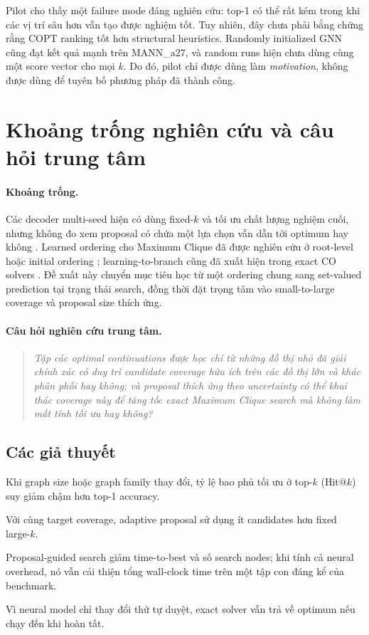 \documentclass[11pt,a4paper]{article}
\makeatletter
\newcommand{\hitk}{\mathrm{Hit@}k}
\makeatother
\begin{document}
Pilot cho thấy một failure mode đáng nghiên cứu: top-1 có thể rất kém trong khi các vị trí sâu hơn vẫn tạo được nghiệm tốt. Tuy nhiên, đây chưa phải bằng chứng rằng COPT ranking tốt hơn structural heuristics. Randomly initialized GNN cũng đạt kết quả mạnh trên MANN\_a27, và random runs hiện chưa dùng cùng một score vector cho mọi $k$. Do đó, pilot chỉ được dùng làm \emph{motivation}, không được dùng để tuyên bố phương pháp đã thành công.

\section{Khoảng trống nghiên cứu và câu hỏi trung tâm}

\paragraph{Khoảng trống.}
Các decoder multi-seed hiện có dùng fixed-$k$ và tối ưu chất lượng nghiệm cuối, nhưng không đo xem proposal có chứa một lựa chọn vẫn dẫn tới optimum hay không \citep{min2022hybrid}. Learned ordering cho Maximum Clique đã được nghiên cứu ở root-level hoặc initial ordering \citep{min2025ordering}; learning-to-branch cũng đã xuất hiện trong exact CO solvers \citep{kuang2024gs4co,zhang2022branching}. Đề xuất này chuyển mục tiêu học từ một ordering chung sang set-valued prediction tại trạng thái search, đồng thời đặt trọng tâm vào small-to-large coverage và proposal size thích ứng.

\paragraph{Câu hỏi nghiên cứu trung tâm.}
\begin{quote}
\emph{Tập các optimal continuations được học chỉ từ những đồ thị nhỏ đã giải chính xác có duy trì candidate coverage hữu ích trên các đồ thị lớn và khác phân phối hay không; và proposal thích ứng theo uncertainty có thể khai thác coverage này để tăng tốc exact Maximum Clique search mà không làm mất tính tối ưu hay không?}
\end{quote}

\subsection{Các giả thuyết}

\begin{description}[leftmargin=1.3cm,labelwidth=1cm]
    \item[H1.] Khi graph size hoặc graph family thay đổi, tỷ lệ bao phủ tối ưu ở top-$k$ ($\hitk$) suy giảm chậm hơn top-1 accuracy.
    \item[H2.] Với cùng target coverage, adaptive proposal sử dụng ít candidates hơn fixed large-$k$.
    \item[H3.] Proposal-guided search giảm time-to-best và số search nodes; khi tính cả neural overhead, nó vẫn cải thiện tổng wall-clock time trên một tập con đáng kể của benchmark.
    \item[H4.] Vì neural model chỉ thay đổi thứ tự duyệt, exact solver vẫn trả về optimum nếu chạy đến khi hoàn tất.
\end{description}
\end{document}
